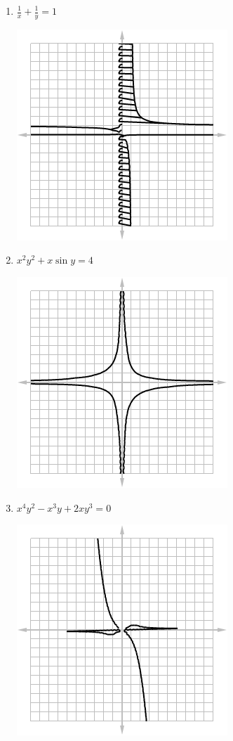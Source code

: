 \begin{enumerate}
\begin{multicols}{2}
\begin{enumerate}
\begin{center}
            \end{center}
      \item $ \frac{1}{x} + \frac{1}{y} = 1 $
            \begin{center}
              \includegraphics[width=0.6\linewidth]{implicit3}
            \end{center}
      \item $ x^2 y^2 + x \sin y = 4 $
            \begin{center}
              \includegraphics[width=0.6\linewidth]{implicit8}
            \end{center}
      \item $ x^4 y^2 - x^3 y + 2 x y^3 = 0 $
            \begin{center}
              \includegraphics[width=0.6\linewidth]{implicit9}

\end{center}
\end{enumerate}
\end{multicols}
\end{enumerate}
